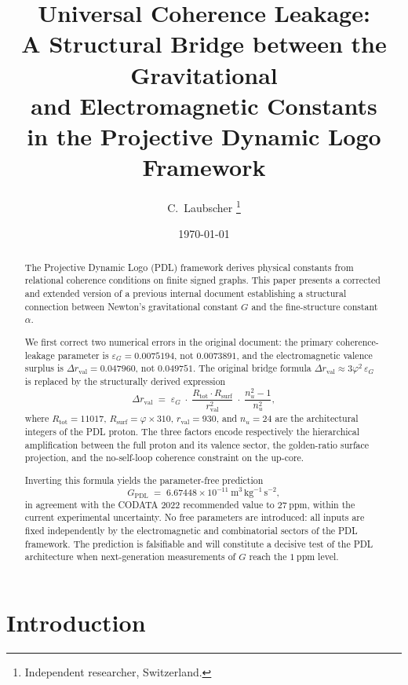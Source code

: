 \documentclass[11pt,a4paper]{article}
\title{Universal Coherence Leakage:\\
A Structural Bridge between the Gravitational\\
and Electromagnetic Constants\\
in the Projective Dynamic Logo Framework}
\author{C.~Laubscher%
\thanks{Independent researcher, Switzerland.}}
\date{\today}
\begin{document}
\maketitle

\begin{abstract}
The Projective Dynamic Logo (PDL) framework derives physical constants from relational coherence conditions on finite signed graphs. This paper presents a corrected and extended version of a previous internal document establishing a structural connection between Newton's gravitational constant $G$ and the fine-structure constant $\alpha$. 

We first correct two numerical errors in the original document: the primary coherence-leakage parameter is $\varepsilon_G = 0.0075194$, not $0.0073891$, and the electromagnetic valence surplus is $\Delta r_{\mathrm{val}} = 0.047960$, not $0.049751$. The original bridge formula $\Delta r_{\mathrm{val}} \approx 3\varphi^2\,\varepsilon_G$ is replaced by the structurally derived expression
\[
    \Delta r_{\mathrm{val}} 
    \;=\; \varepsilon_G\;\cdot\;
    \frac{R_{\mathrm{tot}}\cdot R_{\mathrm{surf}}}{r_{\mathrm{val}}^2}
    \;\cdot\;
    \frac{n_u^2-1}{n_u^2},
\]
where $R_{\mathrm{tot}} = 11017$, $R_{\mathrm{surf}} = \varphi \times 310$, $r_{\mathrm{val}} = 930$, and $n_u = 24$ are the architectural integers of the PDL proton. The three factors encode respectively the hierarchical amplification between the full proton and its valence sector, the golden-ratio surface projection, and the no-self-loop coherence constraint on the up-core.

Inverting this formula yields the parameter-free prediction
\[
    G_{\mathrm{PDL}} \;=\; 6.67448 \times 10^{-11}\ 
    \mathrm{m^3\,kg^{-1}\,s^{-2}},
\]
in agreement with the CODATA 2022 recommended value to $27\ \mathrm{ppm}$, within the current experimental uncertainty. No free parameters are introduced: all inputs are fixed independently by the electromagnetic and combinatorial sectors of the PDL framework. The prediction is falsifiable and will constitute a decisive test of the PDL architecture when next-generation measurements of $G$ reach the $1\ \mathrm{ppm}$ level.
\end{abstract}


\section{Introduction}
\label{sec:intro}
\end{document}
